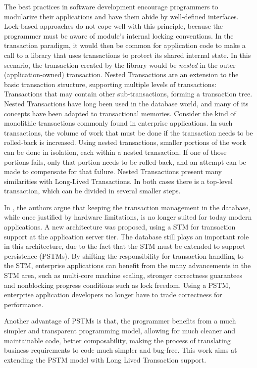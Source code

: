 \documentclass{llncs}
\begin{document}
The best practices in software development encourage programmers to
modularize their applications and have them abide by well-defined
interfaces. Lock-based approaches do not cope well with this
principle, because the programmer must be aware of module's internal
locking conventions. In the transaction paradigm, it would then be
common for application code to make a call to a library that uses
transactions to protect its shared internal state. In this scenario,
the transaction created by the library would be {\it nested} in the
outer (application-owned) transaction. Nested Transactions are an
extension to the basic transaction structure, supporting multiple
levels of transactions: Transactions that may contain other
sub-transactions, forming a transaction tree. Nested Transactions have
long been used in the database world, and many of its concepts have
been adapted to transactional memories. Consider the kind of
monolithic transactions commonly found in enterprise applications. In
such transactions, the volume of work that must be done if the
transaction needs to be rolled-back is increased. Using nested
transactions, smaller portions of the work can be done in isolation,
each within a nested transaction. If one of those portions fails, only
that portion needs to be rolled-back, and an attempt can be made to
compensate for that failure. Nested Transactions present many
similarities with Long-Lived Transactions. In both cases there is a
top-level transaction, which can be divided in several smaller steps.

In \cite{fernandes2011strict}, the authors argue that keeping the
transaction management in the database, while once justified by
hardware limitations, is no longer suited for today modern
applications. A new architecture was proposed, using a STM for
transaction support at the application server tier. The database still
plays an important role in this architecture, due to the fact that the
STM must be extended to support persistence (PSTMs).  By shifting the
responsibility for transaction handling to the STM, enterprise
applications can benefit from the many advancements in the STM area,
such as multi-core machine scaling, stronger correctness guarantees
and nonblocking progress conditions such as lock freedom.  Using a
PSTM, enterprise application developers no longer have to trade
correctness for performance.

Another advantage of PSTMs is that, the programmer benefits from a
much simpler and transparent programming model, allowing for much
cleaner and maintainable code, better composability, making the
process of translating business requirements to code much simpler and
bug-free. This work aims at extending the PSTM model with Long Lived
Transaction support.
\end{document}
